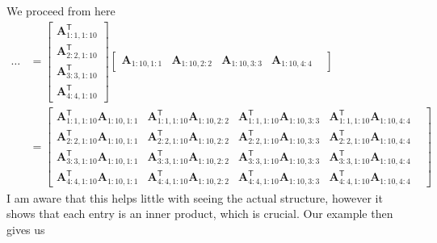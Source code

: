 \documentclass{article}
\begin{document}
\pagebreak

\noindent We proceed from here 
\begin{align*}
\dots &=
     \begin{bmatrix}
        \mathbf{A}^{\mathsf{T}}_{1:1,1:10} \\
        \mathbf{A}^{\mathsf{T}}_{2:2,1:10} \\
        \mathbf{A}^{\mathsf{T}}_{3:3,1:10} \\
        \mathbf{A}^{\mathsf{T}}_{4:4,1:10}
    \end{bmatrix}
    \begin{bmatrix}
        \mathbf{A}_{1:10, 1:1} &
        \mathbf{A}_{1:10, 2:2} &
        \mathbf{A}_{1:10, 3:3} &
        \mathbf{A}_{1:10, 4:4} &
        \end{bmatrix}  \\[2mm]
        &= \begin{bmatrix}
            \mathbf{A}^{\mathsf{T}}_{1:1,1:10}\mathbf{A}_{1:10, 1:1} & 
            \mathbf{A}^{\mathsf{T}}_{1:1,1:10}\mathbf{A}_{1:10, 2:2} & 
            \mathbf{A}^{\mathsf{T}}_{1:1,1:10}\mathbf{A}_{1:10, 3:3} & 
            \mathbf{A}^{\mathsf{T}}_{1:1,1:10}\mathbf{A}_{1:10, 4:4} &  \\
            \mathbf{A}^{\mathsf{T}}_{2:2,1:10}\mathbf{A}_{1:10, 1:1} & 
            \mathbf{A}^{\mathsf{T}}_{2:2,1:10}\mathbf{A}_{1:10, 2:2} & 
            \mathbf{A}^{\mathsf{T}}_{2:2,1:10}\mathbf{A}_{1:10, 3:3} & 
            \mathbf{A}^{\mathsf{T}}_{2:2,1:10}\mathbf{A}_{1:10, 4:4} &  \\
            \mathbf{A}^{\mathsf{T}}_{3:3,1:10}\mathbf{A}_{1:10, 1:1} & 
            \mathbf{A}^{\mathsf{T}}_{3:3,1:10}\mathbf{A}_{1:10, 2:2} & 
            \mathbf{A}^{\mathsf{T}}_{3:3,1:10}\mathbf{A}_{1:10, 3:3} & 
            \mathbf{A}^{\mathsf{T}}_{3:3,1:10}\mathbf{A}_{1:10, 4:4} &  \\
            \mathbf{A}^{\mathsf{T}}_{4:4,1:10}\mathbf{A}_{1:10, 1:1} & 
            \mathbf{A}^{\mathsf{T}}_{4:4,1:10}\mathbf{A}_{1:10, 2:2} & 
            \mathbf{A}^{\mathsf{T}}_{4:4,1:10}\mathbf{A}_{1:10, 3:3} & 
            \mathbf{A}^{\mathsf{T}}_{4:4,1:10}\mathbf{A}_{1:10, 4:4} & 
        \end{bmatrix}
\end{align*}
I am aware that this helps little with seeing the actual structure, however it shows that each entry is an inner product, which is crucial. Our example then gives us
\end{document}
